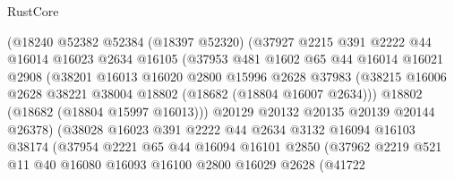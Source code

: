 \begin{lexlean}{RustCore}
\begin{coremodule}
                      (@18240
                        @52382
                        @52384
                        (@18397 @52320)
                        (@37927
                          @2215
                          @391
                          @2222
                          @44
                          @16014
                          @16023
                          @2634
                          @16105
                          (@37953
                            @481
                            @1602
                            @65
                            @44
                            @16014
                            @16021
                            @2908
                            (@38201
                              @16013
                              @16020
                              @2800
                              @15996
                              @2628
                              @37983
                              (@38215
                                @16006
                                @2628
                                @38221
                                @38004
                                @18802
                                (@18682 (@18804 @16007 @2634)))
                              @18802
                              (@18682 (@18804 @15997 @16013)))
                            @20129
                            @20132
                            @20135
                            @20139
                            @20144
                            @26378)
                          (@38028
                            @16023
                            @391
                            @2222
                            @44
                            @2634
                            @3132
                            @16094
                            @16103
                            @38174
                            (@37954
                              @2221
                              @65
                              @44
                              @16094
                              @16101
                              @2850
                              (@37962
                                @2219
                                @521
                                @11
                                @40
                                @16080
                                @16093
                                @16100
                                @2800
                                @16029
                                @2628
                                (@41722

\end{coremodule}
\end{lexlean}
